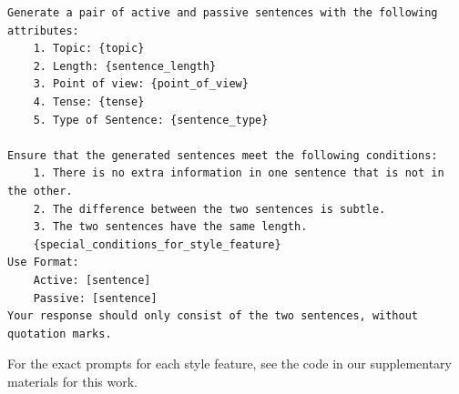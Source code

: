 \vspace{1em}
{\small
\begin{verbatim}
Generate a pair of active and passive sentences with the following attributes:
    1. Topic: {topic}
    2. Length: {sentence_length}
    3. Point of view: {point_of_view}
    4. Tense: {tense}
    5. Type of Sentence: {sentence_type}
    
Ensure that the generated sentences meet the following conditions:
    1. There is no extra information in one sentence that is not in the other. 
    2. The difference between the two sentences is subtle. 
    3. The two sentences have the same length.
    {special_conditions_for_style_feature}
Use Format:
    Active: [sentence]
    Passive: [sentence]
Your response should only consist of the two sentences, without quotation marks.
\end{verbatim}}
\vspace{1em}

\noindent For the exact prompts for each style feature, see the code in our supplementary materials for this work.